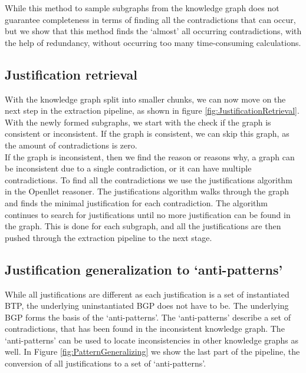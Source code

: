 \documentclass{article}
\begin{document}
While this method to sample subgraphs from the knowledge graph does not guarantee completeness in terms of finding all the contradictions that can occur, but we show that this method finds the `almost' all occurring contradictions, with the help of redundancy, without occurring too many time-consuming calculations. 

\subsection{Justification retrieval}
With the knowledge graph split into smaller chunks, we can now move on the next step in the extraction pipeline, as shown in figure \ref{fig:JustificationRetrieval}.
With the newly formed subgraphs, we start with the check if the graph is consistent or inconsistent. If the graph is consistent, we can skip this graph, as the amount of contradictions is zero.\\ 
If the graph is inconsistent, then we find the reason or reasons why, a graph can be inconsistent due to a single contradiction, or it can have multiple contradictions. 
To find all the contradictions we use the justifications algorithm in the Openllet reasoner. The justifications algorithm walks through the graph and finds the minimal justification for each contradiction. The algorithm continues to search for justifications until no more justification can be found in the graph. This is done for each subgraph, and all the justifications are then pushed through the extraction pipeline to the next stage.\\

\subsection{Justification generalization to `anti-patterns'}
While all justifications are different as each justification is a set of instantiated BTP, the underlying uninstantiated BGP does not have to be. The underlying BGP forms the basis of the `anti-patterns'. The `anti-patterns' describe a set of contradictions, that has been found in the inconsistent knowledge graph. The `anti-patterns' can be used to locate inconsistencies in other knowledge graphs as well. In Figure \ref{fig:PatternGeneralizing} we show the last part of the pipeline, the conversion of all justifications to a set of `anti-patterns'.
\end{document}
